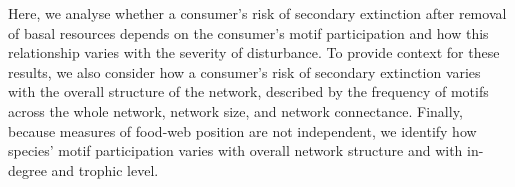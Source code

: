 \documentclass[12pt]{article}
\begin{document}
\begin{spacing}{2.0}
    
    Here, we analyse whether a consumer's risk of secondary extinction after removal of basal resources depends on the consumer's motif participation and how this relationship varies with the severity of disturbance.
    To provide context for these results, we also consider how a consumer's risk of secondary extinction varies with the overall structure of the network, described by the frequency of motifs across the whole network, network size, and network connectance.
    Finally, because measures of food-web position are not independent, we identify how species' motif participation varies with overall network structure and with in-degree and trophic level.


    





\end{spacing}
\end{document}
